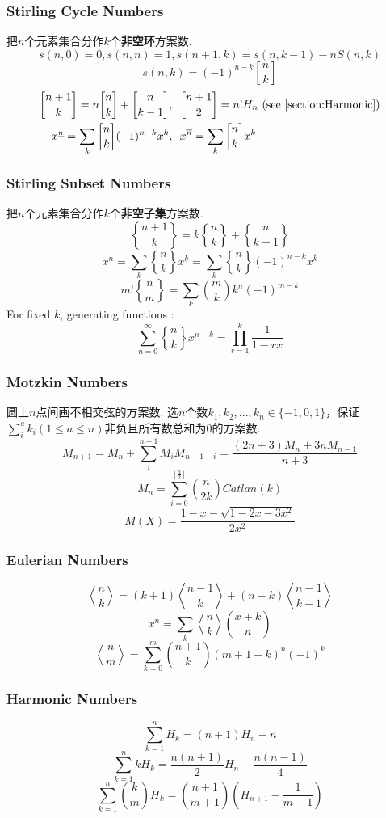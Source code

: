 \begin{small}
\subsubsection{Stirling Cycle Numbers}
把$n$个元素集合分作$k$个\textbf{非空环}方案数.
\[s(n,0)=0,s(n,n)=1,s(n+1,k)=s(n,k-1)-nS(n,k)\]
\[s(n,k)=(-1)^{n-k}{n \brack k}\]
\begin{align*}
 {n+1 \brack k} = n{n \brack k} + {n \brack k-1},&\ \  {n+1 \brack 2} = n!H_n \text{ (see \ref{section:Harmonic})}\\
x^{\underline{n}} = \sum_k{ {n \brack k}(-1)^{n-k}x^k },&\ \  x^{\overline{n}} = \sum_k{ {n \brack k}x^k } \\
 \end{align*}
\subsubsection{Stirling Subset Numbers}
把$n$个元素集合分作$k$个\textbf{非空子集}方案数.
\[ {n+1 \brace k} = k{n \brace k} + {n \brace k-1} \]
\[ x^n = \sum_k{ {n \brace k}x^{\underline{k}} } = \sum_k{ {n \brace k}(-1)^{n-k}x^{\overline{k}} } \]
\[ m!{n \brace m} = \sum_k{m \choose k}k^n(-1)^{m-k} \]
For fixed $k$, generating functions :
\[\sum_{n=0}^{\infty}{n \brace k}x^{n-k}=\prod_{r=1}^{k}\frac{1}{1-rx}\]
\subsubsection{Motzkin Numbers}
圆上$n$点间画不相交弦的方案数. 选$n$个数$k_1,k_2,...,k_n\in\{-1,0,1\}$，保证$\sum_i^ak_i(1\leq a\leq n)$非负且所有数总和为$0$的方案数. \[M_{n+1}=M_n+\sum_i^{n-1}M_iM_{n-1-i}=\frac{(2n+3)M_n+3nM_{n-1}}{n+3}\]
\[M_n=\sum_{i=0}^{\lfloor \frac{n}{2}\rfloor}\binom{n}{2k}Catlan(k)\]
\[M(X)=\frac{1-x-\sqrt{1-2x-3x^2}}{2x^2}\]
\subsubsection{Eulerian Numbers}
\[ {n \bangle k} = (k+1){n-1 \bangle k} + (n-k){n-1 \bangle k-1} \]
\[ x^n = \sum_k{ {n \bangle k}{x+k \choose n} } \]
\[ {n \bangle m} = \sum_{k=0}^m{n+1 \choose k}(m+1-k)^n(-1)^k \]
\subsubsection{Harmonic Numbers}
\label{section:Harmonic}
\[ \sum_{k=1}^nH_k = (n+1)H_n-n \]
\[ \sum_{k=1}^nkH_k = \frac{n(n+1)}{2}H_n - \frac{n(n-1)}{4} \]
\[ \sum_{k=1}^n{k \choose m}H_k = {n+1 \choose m+1}(H_{n+1} - \frac{1}{m+1}) \]

\end{small}
